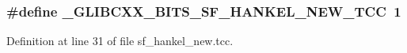 \subsubsection[{\+\_\+\+G\+L\+I\+B\+C\+X\+X\+\_\+\+B\+I\+T\+S\+\_\+\+S\+F\+\_\+\+H\+A\+N\+K\+E\+L\+\_\+\+N\+E\+W\+\_\+\+T\+C\+C}]{\setlength{\rightskip}{0pt plus 5cm}\#define \+\_\+\+G\+L\+I\+B\+C\+X\+X\+\_\+\+B\+I\+T\+S\+\_\+\+S\+F\+\_\+\+H\+A\+N\+K\+E\+L\+\_\+\+N\+E\+W\+\_\+\+T\+C\+C~1}\label{sf__hankel__new_8tcc_a3f0d94d8fb94ad2e003fd0b54ce51a6d}


Definition at line 31 of file sf\+\_\+hankel\+\_\+new.\+tcc.

